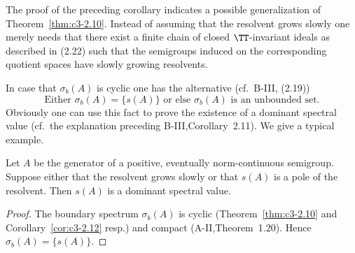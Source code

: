 The proof of the preceding corollary indicates a possible generalization of Theorem~\ref{thm:c3-2.10}.
Instead of assuming that the resolvent grows slowly one merely needs that there exist a finite chain of closed $\TT$-invariant ideals as described in (2.22) such that the semigroups induced on the corresponding quotient spaces have slowly growing resolvents.

In case that $\sigma_{b}(A)$ is cyclic one has the alternative (cf.\ B-III, (2.19))
\[
\text{Either $\sigma_{b}(A) = \{s(A)\}$ or else $\sigma_{b}(A)$ is an unbounded set.}
\]
Obviously one can use this fact to prove the existence of a dominant spectral value (cf.\ the explanation preceding B-III,Corollary~2.11).
We give a typical example.
\begin{corollary}\label{cor:c3-2.13}
	Let $A$ be the generator of a positive, eventually norm-continuous semigroup.
	Suppose either that the resolvent grows slowly or that $s(A)$ is a pole of the resolvent.
	Then $s(A)$ is a dominant spectral value.
\end{corollary}

\begin{proof}
The boundary spectrum $\sigma_{b}(A)$ is cyclic (Theorem~\ref{thm:c3-2.10} and Corollary~\ref{cor:c3-2.12} resp.) and compact (A-II,Theorem~1.20).
Hence $\sigma_{b}(A) = \{s(A)\}$.
\end{proof}

